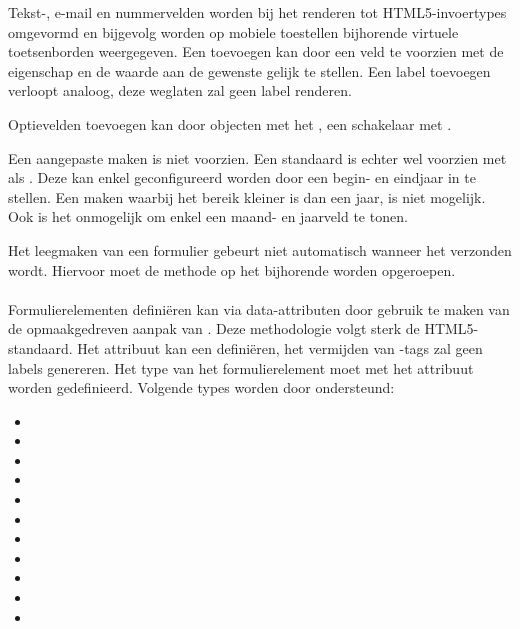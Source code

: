 Tekst-, e-mail en nummervelden worden bij het renderen tot HTML5-invoertypes omgevormd en bijgevolg worden op mobiele toestellen bijhorende virtuele toetsenborden weergegeven.
Een  toevoegen kan door een veld te voorzien met de eigenschap  en de waarde aan de gewenste  gelijk te stellen. 
Een label toevoegen verloopt analoog,  deze weglaten zal geen label renderen.

Optievelden toevoegen kan door objecten met het  ,  een schakelaar met  .

Een aangepaste  maken is niet voorzien.
Een standaard  is echter wel voorzien met  als .
Deze kan enkel geconfigureerd worden door een begin- en eindjaar in te stellen.
Een  maken waarbij het bereik kleiner is dan een jaar, is niet mogelijk.
Ook is het onmogelijk om enkel een maand- en jaarveld te tonen.

Het leegmaken van een formulier gebeurt niet automatisch wanneer het verzonden wordt.
Hiervoor moet de  methode op het bijhorende  worden opgeroepen.

\paragraph{\kendo}
 Formulierelementen definiëren kan via data-attributen door gebruik te maken van de opmaakgedreven aanpak van \kendo.
 Deze methodologie volgt sterk de HTML5-standaard.
 Het attribuut kan een  definiëren,  het vermijden van -tags zal geen labels genereren.
 Het type van het formulierelement moet met het  attribuut worden gedefinieerd.
 Volgende types worden door \kendo{} ondersteund:
 \begin{itemize}
  \item {}
  \item {}
  \item {}
  \item {}
  \item {}
  \item {}
  \item {}
  \item {}
  \item {}
  \item {} 
  \item {}
 \end{itemize}
 
